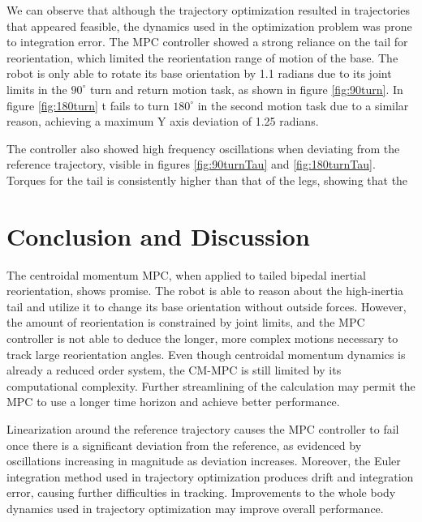 \documentclass[conference]{IEEEtran}
\begin{document}
We can observe that although the trajectory optimization resulted in trajectories that appeared feasible, the dynamics used in the optimization problem was prone to integration error. The MPC controller showed a strong reliance on the tail for reorientation, which limited the reorientation range of motion of the base. The robot is only able to rotate its base orientation by 1.1 radians due to its joint limits in the $90^{\circ}$ turn and return motion task, as shown in figure \ref{fig:90turn}. In figure \ref{fig:180turn} t fails to turn $180^{\circ}$ in the second motion task due to a similar reason, achieving a maximum Y axis deviation of 1.25 radians.

The controller also showed high frequency oscillations when deviating from the reference trajectory, visible in figures \ref{fig:90turnTau} and \ref{fig:180turnTau}. Torques for the tail is consistently higher than that of the legs, showing that the 

\section{Conclusion and Discussion}

The centroidal momentum MPC, when applied to tailed bipedal inertial reorientation, shows promise. The robot is able to reason about the high-inertia tail and utilize it to change its base orientation without outside forces. However, the amount of reorientation is constrained by joint limits, and the MPC controller is not able to deduce the longer, more complex motions necessary to track large reorientation angles. Even though centroidal momentum dynamics is already a reduced order system, the CM-MPC is still limited by its computational complexity. Further streamlining of the calculation may permit the MPC to use a longer time horizon and achieve better performance. 

Linearization around the reference trajectory causes the MPC controller to fail once there is a significant deviation from the reference, as evidenced by oscillations increasing in magnitude as deviation increases. Moreover, the Euler integration method used in trajectory optimization produces drift and integration error, causing further difficulties in tracking. Improvements to the whole body dynamics used in trajectory optimization may improve overall performance.


\end{document}
